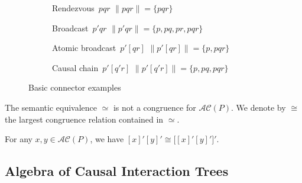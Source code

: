 \documentclass{llncs}
\newcommand{\intsem}[1]{\ensuremath{\|{#1}\|}}
\newcommand{\ac}{\ensuremath{\mathcal{AC}}}
\begin{document}
\begin{figure}
  \centering
  \begin{subfigure}[b]{0.18\textwidth}
    \centering
    
    \caption{\centering Rendezvous~$pqr$
      $\intsem{pqr} = \{pqr\}$}
    \label{fig:connectors:rdv}
  \end{subfigure}%
  \hfill %
  \begin{subfigure}[b]{0.24\textwidth}
    \centering
    
    \caption{\centering Broadcast~$p'qr$
      $\intsem{p'qr} = \{p, pq, pr, pqr\}$}
    \label{fig:connectors:bdc}
  \end{subfigure}%
  \hfill %
  \begin{subfigure}[b]{0.24\textwidth}
    \centering
    
    \caption{\centering Atomic broadcast~$p'[qr]$
      $\intsem{p'[qr]} = \{p, pqr\}$}
    \label{fig:connectors:atomic}
  \end{subfigure}%
  \hfill %
  \begin{subfigure}[b]{0.23\textwidth}
    \centering
    
    \caption{\centering Causal chain~$p'[q'r]$
      $\intsem{p'[q'r]} = \{p, pq, pqr\}$}
    \label{fig:connectors:causal}
  \end{subfigure}%
  \caption{Basic connector examples}
  \label{fig:connectors}
\end{figure}

The semantic equivalence $\simeq$ is not a congruence for $\ac(P)$.
We denote by $\cong$ the largest congruence relation contained in
$\simeq$.

\begin{property}
  \label{prop:cong}
  For any $x, y \in \ac(P)$, we have $[x]'[y]' \cong \bigl[[x]'[y]'\bigr]'$.
\end{property}


\subsection{Algebra of Causal Interaction Trees}
\label{secn:trees}
\end{document}
